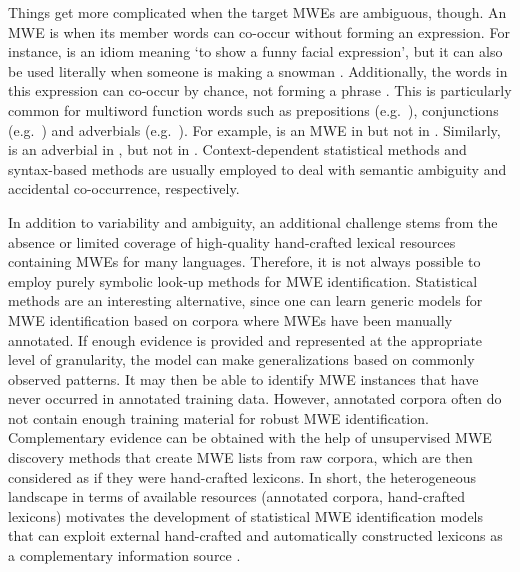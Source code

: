 \documentclass[output=paper,modfonts]{langscibook}
\begin{document}
Things get more complicated when the target MWEs are ambiguous, though. An MWE is  when its member words can co-occur without forming an expression. 
For instance,  is an idiom meaning `to show a funny facial expression', but it can also be used literally when someone is making a snowman \citep{fazly-cook-stevenson:2009:CL}. 
Additionally, the words in this expression can co-occur by chance, not forming a phrase \citep{BoukobzaR09,shigeto-EtAl:2013:MWE}. This is particularly common for multiword function words such as prepositions (e.g.\ ), conjunctions (e.g.\ ) and adverbials (e.g.\ ). 
For example,  is an MWE in  but not in . 
Similarly,  is an adverbial in , but not in .
Context-dependent statistical methods \citep{fazly-cook-stevenson:2009:CL,BoukobzaR09} and syntax-based methods \citep{candito-constant:acl:2014,nasr:acl:2015} are usually employed to deal with semantic ambiguity and accidental co-occurrence, respectively.

In addition to variability and ambiguity, an additional challenge stems from the absence or limited coverage of high-quality hand-crafted lexical resources containing MWEs for many languages.
Therefore, it is not always possible to employ purely symbolic look-up methods for MWE identification.
Statistical methods are an interesting alternative, since one can learn generic models for MWE identification based on corpora where MWEs have been manually annotated.
If enough evidence is provided and represented at the appropriate level of granularity, the model can make generalizations based on commonly observed patterns. It may then be able to identify MWE instances that have never occurred in annotated training data.
However, annotated corpora often do not contain enough training material for robust MWE identification. 
Complementary evidence can be obtained with the help of unsupervised MWE discovery methods that create MWE lists from raw corpora, which are then considered as if they were hand-crafted lexicons.
In short, the heterogeneous landscape in terms of available resources (annotated corpora, hand-crafted lexicons) motivates the development of statistical MWE identification models that can exploit external hand-crafted and automatically constructed lexicons as a complementary information source \citep{constant-sigogne:2011:MWE,Schneider14b,riedl-biemann:2016:MWE}.
\end{document}
